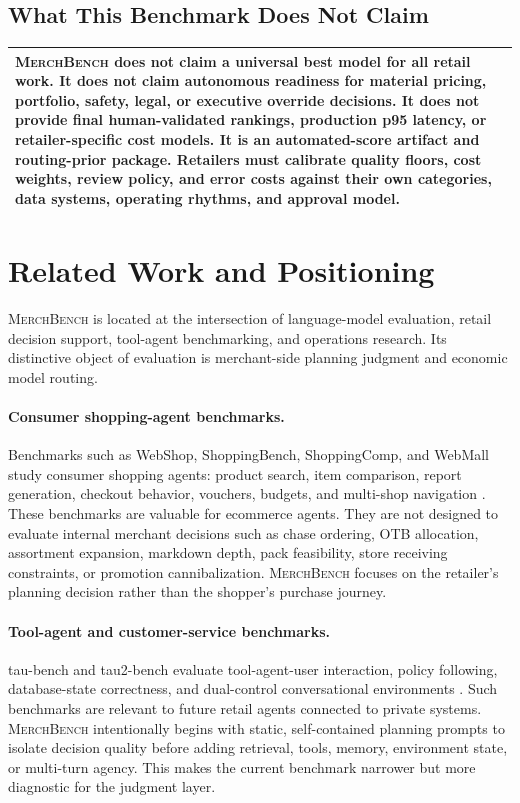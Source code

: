 \documentclass[11pt]{article}
\newcommand{\benchmark}{\textsc{MerchBench}}
\begin{document}
\subsection*{What This Benchmark Does Not Claim}

\begin{center}
\begin{tabularx}{0.94\textwidth}{X}
\toprule
\benchmark{} does not claim a universal best model for all retail work. It does not claim autonomous readiness for material pricing, portfolio, safety, legal, or executive override decisions. It does not provide final human-validated rankings, production p95 latency, or retailer-specific cost models. It is an automated-score artifact and routing-prior package. Retailers must calibrate quality floors, cost weights, review policy, and error costs against their own categories, data systems, operating rhythms, and approval model. \\
\bottomrule
\end{tabularx}
\end{center}

\section{Related Work and Positioning}

\benchmark{} is located at the intersection of language-model evaluation, retail decision support, tool-agent benchmarking, and operations research. Its distinctive object of evaluation is merchant-side planning judgment and economic model routing.

\paragraph{Consumer shopping-agent benchmarks.}
Benchmarks such as WebShop, ShoppingBench, ShoppingComp, and WebMall study consumer shopping agents: product search, item comparison, report generation, checkout behavior, vouchers, budgets, and multi-shop navigation \cite{webshop, shoppingbench, shoppingcomp, webmall}. These benchmarks are valuable for ecommerce agents. They are not designed to evaluate internal merchant decisions such as chase ordering, OTB allocation, assortment expansion, markdown depth, pack feasibility, store receiving constraints, or promotion cannibalization. \benchmark{} focuses on the retailer's planning decision rather than the shopper's purchase journey.

\paragraph{Tool-agent and customer-service benchmarks.}
tau-bench and tau2-bench evaluate tool-agent-user interaction, policy following, database-state correctness, and dual-control conversational environments \cite{taubench, tau2bench}. Such benchmarks are relevant to future retail agents connected to private systems. \benchmark{} intentionally begins with static, self-contained planning prompts to isolate decision quality before adding retrieval, tools, memory, environment state, or multi-turn agency. This makes the current benchmark narrower but more diagnostic for the judgment layer.
\end{document}
